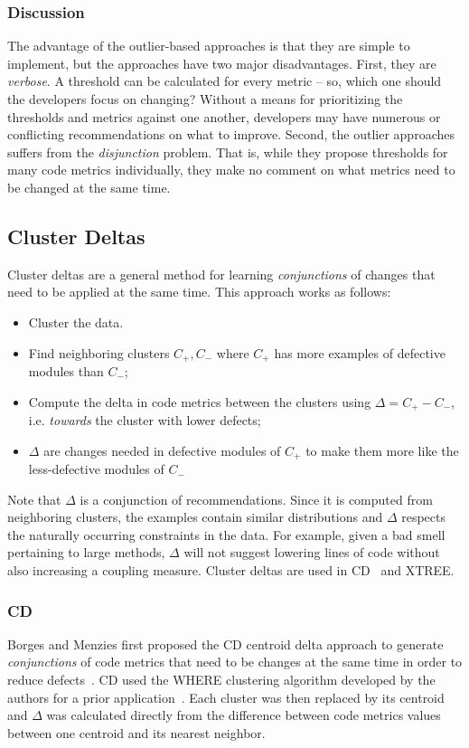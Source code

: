 \documentclass{sig-alternate}
\theoremstyle{break}
\begin{document}
\subsubsection{Discussion }\label{sect:disc}
The advantage of the outlier-based
approaches is that they are simple to implement, but the approaches have   two  major disadvantages. 
First, they are {\em verbose}. A threshold can be calculated for every metric -- so, which one should the developers focus on changing? Without a means for prioritizing the  thresholds and metrics against one another, developers may have numerous or conflicting recommendations on what to improve. Second, the outlier approaches suffers from
the {\em disjunction} problem.
That is, while
 they propose thresholds for many code metrics
individually, they make no comment on what
metrics need to be changed at the same time. 



\subsection{Cluster Deltas}

Cluster deltas are a general method
for learning {\em conjunctions} of changes
that need to be applied at the same time. 
This approach works as follows:
\begin{itemize}
    \item Cluster the data. 
    \item Find
neighboring clusters $C_+,C_-$ where $C_+$ has more examples of defective
modules than $C_-$;
\item Compute the  delta   in code metrics between the clusters using \mbox{$\Delta = C_+ - C_-$}, i.e.
{\em towards} the cluster with lower defects;
\item $\Delta$ are changes needed in defective modules of $C_+$ to
      make them more like the less-defective modules of $C_-$
\end{itemize}
Note that $\Delta$ is a conjunction of  recommendations.
Since it is computed
from neighboring clusters, the examples contain similar distributions and $\Delta$ respects the naturally occurring constraints in the data. For example,
given a bad smell pertaining to large methods,   $\Delta$   will not  suggest lowering lines of code
without also increasing a coupling measure. 
Cluster deltas are used in CD~\cite{me12c} and XTREE.

\subsubsection{CD}
Borges and Menzies first proposed the CD centroid delta approach to
generate {\em conjunctions} of code metrics
that need to be changes at the same time
in order to reduce defects~\cite{me12c}.
CD used the WHERE clustering algorithm developed by the
authors for a prior application~\cite{localvsglobal}.
Each cluster was then replaced by its centroid
and $\Delta$ was calculated directly from the difference
between code metrics values between one centroid
and its nearest neighbor.
\end{document}
